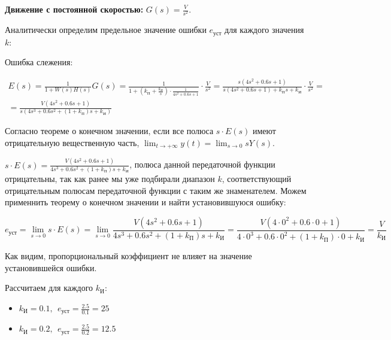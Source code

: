 \textbf{Движение с постоянной скоростью: }$G(s)=\frac{V}{s^2 }$.


Аналитически определим предельное значение ошибки $e_{уст}$ для каждого значения $k$:


Ошибка слежения:

\begin{par}
$$\begin{array}{l}
E(s)=\frac{1}{1+W(s)H(s)}G(s)=\frac{1}{1+\left(k_\text{П} +\frac{k_\text{И} }{s}\right)\cdot \frac{1}{4s^2 +0.6s+1}}\cdot \frac{V}{s^2 }=\frac{s(4s^2 +0.6s+1)}{s(4s^2 +0.6s+1)+k_\text{П} s+k_\text{И} }\cdot \frac{V}{s^2 }=\\
=\frac{V(4s^2 +0.6s+1)}{s(4s^3 +0.6s^2 +(1+k_\text{П} )s+k_\text{И} )}
\end{array}$$
\end{par}


Согласно теореме о конечном значении, если все полюса $s\cdot E(s)$ имеют отрицательную вещественную часть, $\lim_{t\to +\infty } y(t)=\lim_{s\to 0} sY(s)$.


$s\cdot E(s)=\frac{V(4s^2 +0.6s+1)}{4s^3 +0.6s^2 +(1+k_\text{П} )s+k_\text{И} }$, полюса данной передаточной функции отрицательны, так как ранее мы уже подбирали диапазон $k$, соответствующий отрицательным полюсам передаточной функции с таким же знаменателем. Можем применнить теорему о конечном значении и найти установившуюся ошибку:

\begin{par}
$$e_{\text{уст}} =\lim_{s\to 0} s\cdot E(s)=\lim_{s\to 0} \frac{V(4s^2 +0.6s+1)}{4s^3 +0.6s^2 +(1+k_\text{П} )s+k_\text{И} }=\frac{V(4\cdot 0^2 +0.6\cdot 0+1)}{4\cdot 0^3 +0.6\cdot 0^2 +(1+k_\text{П} )\cdot 0+k_\text{И} }=\frac{V}{k_\text{И} }$$
\end{par}


Как видим, пропорциональный коэффициент не влияет на значение установившейся ошибки.


Рассчитаем для каждого $k_\text{И}$:

\begin{itemize}
\setlength{\itemsep}{-1ex}
   \item{\begin{flushleft} $\displaystyle k_\text{И} =0.1,~~e_{\text{уст}} =\frac{2.5}{0.1}=25$ \end{flushleft}}
   \item{\begin{flushleft} $\displaystyle k_\text{И} =0.2,~~e_{\text{уст}} =\frac{2.5}{0.2}=12.5$ \end{flushleft}}
\end{itemize}


